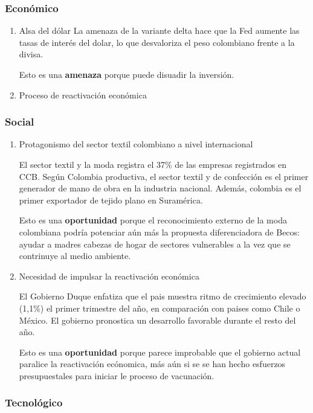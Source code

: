 \documentclass[11pt]{article}
\begin{document}
\subsubsection{Económico}
\label{sec:orga1c8f58}
\begin{enumerate}
\item Alsa del dólar
\label{sec:orgb580210}
La amenaza de la variante delta hace que la Fed aumente las tasas de
interés del dolar, lo que desvaloriza el peso colombiano frente a la
divisa.

Esto es una \textbf{amenaza} porque puede disuadir la inversión.

\item Proceso de reactivación económica
\label{sec:org9d45ccf}
\end{enumerate}
\subsubsection{Social}
\label{sec:org3c12fed}
\begin{enumerate}
\item Protagonismo del sector textil colombiano a nivel internacional
\label{sec:org3401d7b}

El sector textil y la moda registra el 37\% de las empresas registrados
en CCB.  Según Colombia productiva, el sector textil y de confección
es el primer generador de mano de obra en la industria
nacional. Además, colombia es el primer exportador de tejido plano en
Suramérica.

Esto es una \textbf{oportunidad} porque el reconocimiento externo de la moda
colombiana podría potenciar aún más la propuesta diferenciadora de
Becos: ayudar a madres cabezas de hogar de sectores vulnerables a la
vez que se contrinuye al medio ambiente.

\item Necesidad de impulsar la reactivación económica
\label{sec:org88df624}

El Gobierno Duque enfatiza que el pais muestra ritmo de crecimiento
elevado (1,1\%) el primer trimestre del año, en comparación con paises
como Chile o México. El gobierno pronostica un desarrollo favorable
durante el resto del año.

Esto es una \textbf{oportunidad} porque parece improbable que el gobierno
actual paralice la reactivación ecónomica, más aún si se se han hecho
esfuerzos presupuestales para iniciar le proceso de vacunación.
\end{enumerate}

\subsubsection{Tecnológico}
\label{sec:orgcf4ae6c}
\end{document}
